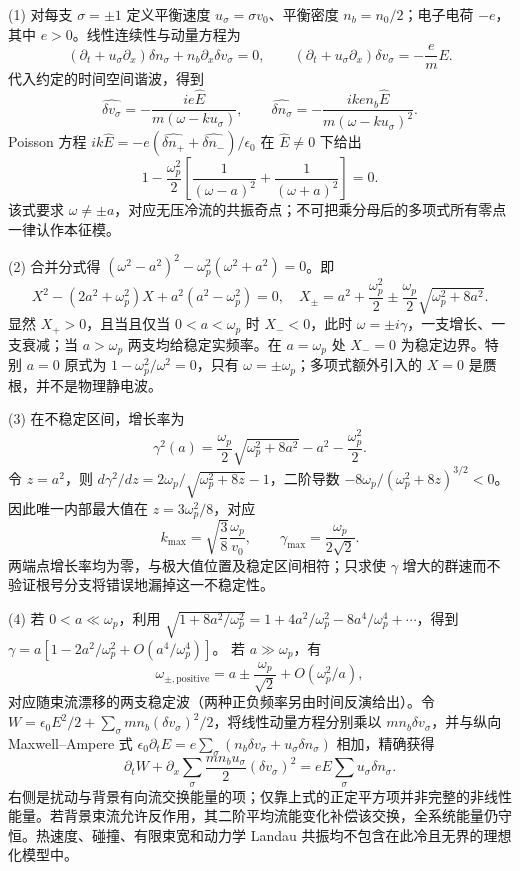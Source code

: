 (1) 对每支 \(\sigma=\pm1\) 定义平衡速度 \(u_\sigma=\sigma v_0\)、平衡密度 \(n_b=n_0/2\)；电子电荷 \(-e\)，其中 \(e>0\)。线性连续性与动量方程为
\[
(\partial_t+u_\sigma\partial_x)\delta n_\sigma+n_b\partial_x\delta v_\sigma=0,\qquad
(\partial_t+u_\sigma\partial_x)\delta v_\sigma=-\frac{e}{m}E .
\]
代入约定的时间空间谐波，得到
\[
\widehat{\delta v_\sigma}=-\frac{ie\widehat E}{m(\omega-ku_\sigma)},\qquad
\widehat{\delta n_\sigma}=-\frac{ike n_b\widehat E}{m(\omega-ku_\sigma)^2}.
\]
Poisson 方程 \(ik\widehat E=-e(\widehat{\delta n_+}+\widehat{\delta n_-})/\epsilon_0\) 在 \(\widehat E\ne0\) 下给出
\[
1-\frac{\omega_p^2}{2}\left[\frac1{(\omega-a)^2}+\frac1{(\omega+a)^2}\right]=0.
\]
该式要求 \(\omega\ne\pm a\)，对应无压冷流的共振奇点；不可把乘分母后的多项式所有零点一律认作本征模。

(2) 合并分式得 \((\omega^2-a^2)^2-\omega_p^2(\omega^2+a^2)=0\)。即
\[
X^2-(2a^2+\omega_p^2)X+a^2(a^2-\omega_p^2)=0,\quad
X_\pm=a^2+\frac{\omega_p^2}{2}\pm
\frac{\omega_p}{2}\sqrt{\omega_p^2+8a^2}.
\]
显然 \(X_+>0\)，且当且仅当 \(0<a<\omega_p\) 时 \(X_-<0\)，此时 \(\omega=\pm i\gamma\)，一支增长、一支衰减；当 \(a>\omega_p\) 两支均给稳定实频率。在 \(a=\omega_p\) 处 \(X_-=0\) 为稳定边界。特别 \(a=0\) 原式为 \(1-\omega_p^2/\omega^2=0\)，只有 \(\omega=\pm\omega_p\)；多项式额外引入的 \(X=0\) 是赝根，并不是物理静电波。

(3) 在不稳定区间，增长率为
\[
\gamma^2(a)=\frac{\omega_p}{2}\sqrt{\omega_p^2+8a^2}
-a^2-\frac{\omega_p^2}{2}.
\]
令 \(z=a^2\)，则 \(d\gamma^2/dz=2\omega_p/\sqrt{\omega_p^2+8z}-1\)，二阶导数
\(-8\omega_p/(\omega_p^2+8z)^{3/2}<0\)。因此唯一内部最大值在
\(z=3\omega_p^2/8\)，对应
\[
k_{\max}=\sqrt{\frac38}\frac{\omega_p}{v_0},\qquad
\gamma_{\max}=\frac{\omega_p}{2\sqrt2}.
\]
两端点增长率均为零，与极大值位置及稳定区间相符；只求使 \(\gamma\) 增大的群速而不验证根号分支将错误地漏掉这一不稳定性。

(4) 若 \(0<a\ll\omega_p\)，利用
\(\sqrt{1+8a^2/\omega_p^2}=1+4a^2/\omega_p^2-8a^4/\omega_p^4+\cdots\)，得到
\(\gamma=a[1-2a^2/\omega_p^2+O(a^4/\omega_p^4)]\)。
若 \(a\gg\omega_p\)，有
\[
\omega_{\pm,\mathrm{positive}}=
a\pm\frac{\omega_p}{\sqrt2}+O(\omega_p^2/a),
\]
对应随束流漂移的两支稳定波（两种正负频率另由时间反演给出）。令
\(W=\epsilon_0E^2/2+\sum_\sigma mn_b(\delta v_\sigma)^2/2\)，将线性动量方程分别乘以 \(mn_b\delta v_\sigma\)，并与纵向 Maxwell–Ampere 式
\(\epsilon_0\partial_tE=e\sum_\sigma(n_b\delta v_\sigma+u_\sigma\delta n_\sigma)\)
相加，精确获得
\[
\partial_tW+\partial_x\sum_\sigma\frac{mn_bu_\sigma}{2}(\delta v_\sigma)^2
=eE\sum_\sigma u_\sigma\delta n_\sigma.
\]
右侧是扰动与背景有向流交换能量的项；仅靠上式的正定平方项并非完整的非线性能量。若背景束流允许反作用，其二阶平均流能变化补偿该交换，全系统能量仍守恒。热速度、碰撞、有限束宽和动力学 Landau 共振均不包含在此冷且无界的理想化模型中。